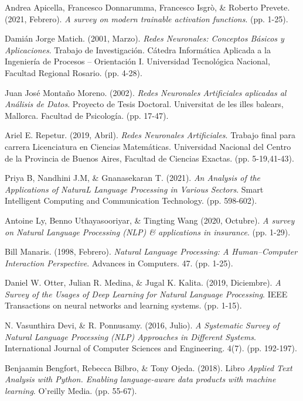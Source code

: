 \documentclass[12pt,a4paper]{article}
\begin{document}
\begin{sloppypar}
\begin{thebibliography}{9}
Andrea Apicella, Francesco Donnarumma, Francesco Isgrò, \& Roberto Prevete. (2021, Febrero). \textit{A survey on modern trainable activation functions}. (pp. 1-25).

Damián Jorge Matich. (2001, Marzo). \textit{Redes Neuronales: Conceptos Básicos y Aplicaciones}. Trabajo de Investigación. Cátedra Informática Aplicada a la Ingeniería de Procesos – Orientación I. Universidad Tecnológica Nacional, Facultad Regional Rosario. (pp. 4-28).

Juan José Montaño Moreno. (2002). \textit{Redes Neuronales Artificiales aplicadas al Análisis de Datos}. Proyecto de Tesis Doctoral. Universitat de les illes balears, Mallorca. Facultad de Psicología. (pp. 17-47).

Ariel E. Repetur. (2019, Abril). \textit{Redes Neuronales Artificiales}. Trabajo final para carrera {Licenciatura en Ciencias Matemáticas}. Universidad Nacional del Centro de la Provincia de Buenos Aires, Facultad de Ciencias Exactas. (pp. 5-19,41-43).

Priya B, Nandhini J.M, \& Gnanasekaran T. (2021). \textit{An Analysis of the Applications of NaturaL Language Processing in Various Sectors}. Smart Intelligent Computing and Communication Technology. (pp. 598-602).

Antoine Ly, Benno Uthayasooriyar, \& Tingting Wang (2020, Octubre). \textit{A survey on Natural Language Processing (NLP) \& applications in insurance}. (pp. 1-29).

Bill Manaris. (1998, Febrero). \textit{Natural Language Processing: A Human–Computer Interaction Perspective}. Advances in Computers. 47. (pp. 1-25).

Daniel W. Otter, Julian R. Medina, \& Jugal K. Kalita. (2019, Diciembre). \textit{A Survey of the Usages of Deep Learning for Natural Language Processing}. IEEE Transactions on neural networks and learning systems. (pp. 1-15).

N. Vasunthira Devi, \& R. Ponnusamy. (2016, Julio). \textit{A Systematic Survey of Natural Language Processing (NLP) Approaches in Different Systems}. International Journal of Computer Sciences and Engineering. 4(7). (pp. 192-197).

Benjaamin Bengfort, Rebecca Bilbro, \& Tony Ojeda. (2018). Libro \textit{Applied Text Analysis with Python. Enabling language-aware data products with machine learning}. O’reilly Media. (pp. 55-67).


\end{thebibliography}
\end{sloppypar}
\end{document}
